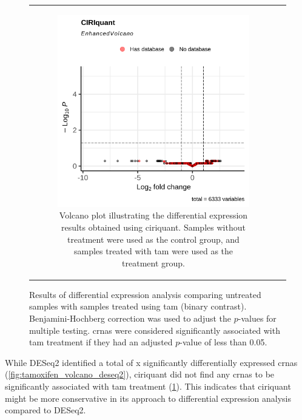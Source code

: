 \begin{figure}[H]
\begin{tabular}{cc}
\begin{subfigure}{0.5\textwidth}
            \includegraphics[width=\linewidth]{chapters/4_results_and_discussion/figures/dea/ciriquant/tamoxifen/volcano.png}
            \caption{Volcano plot illustrating the differential expression
                results obtained using \gls{ciriquant}.
                Samples without treatment were used as the control group, and samples treated
                with \gls{tam} were used as the treatment group.
            }
            \label{fig:tamoxifen_volcano_ciriquant}
        \end{subfigure}

    \end{tabular}
    \caption{Results of differential expression analysis comparing untreated
        samples with samples treated using \gls{tam} (binary contrast).
        Benjamini-Hochberg correction\supercite{benjamini_controlling_1995} was used to
        adjust the $p$-values for multiple testing.
        \Glspl{crna} were considered significantly associated with \gls{tam}
        treatment if they had an adjusted $p$-value of less than 0.05.
    } \label{fig:tamoxifen_volcano} \end{figure}

While DESeq2 identified a total of x significantly differentially expressed
\glspl{crna} (\cref{fig:tamoxifen_volcano_deseq2}), \gls{ciriquant} did not
find any \glspl{crna} to be significantly associated with \gls{tam} treatment
(\cref{fig:tamoxifen_volcano_ciriquant}).
This indicates that \gls{ciriquant} might be more conservative in its approach
to differential expression analysis compared to DESeq2.

